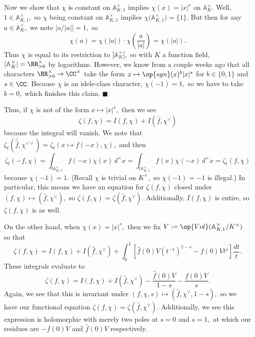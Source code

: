 Now we show that $\chi$ is constant on $\mathbb A^\times_{K,1}$ implies $\chi(x)=|x|^s$ on $\mathbb A^\times_K.$ Well, $1\in\mathbb A_{K,1}^\times,$ so $\chi$ being constant on $\mathbb A_{K,1}^\times$ implies $\chi\big(\mathbb A_{K,1}^\times\big)=\{1\}.$ But then for any $a\in\mathbb A^\times_K,$ we note $|a/|a||=1,$ so
\[\chi(a)=\chi(|a|)\cdot\chi\left(\frac a{|a|}\right)=\chi(|a|).\]
Thus $\chi$ is equal to its restriction to $|\mathbb A_K^\times|,$ so with $K$ a function field, $|\mathbb A_K^\times|=\RR^\times_{>0}$ by logarithms. However, we know from a couple weeks ago that all characters $\RR^\times_{>0}\to\CC^\times$ take the form $x\mapsto\op{sgn}(x)^b|x|^s$ for $b\in\{0,1\}$ and $s\in\CC.$ Because $\chi$ is an idele-class character, $\chi(-1)=1,$ so we have to take $b=0,$ which finishes this claim. $\blacksquare$

Thus, if $\chi$ is not of the form $x\mapsto|x|^s,$ then we see
\[\zeta(f,\chi)=I(f,\chi)+I(\hat f,\chi^\vee)\]
because the integral will vanish. We note that $\zeta_t(\hat\hat f,\chi^{\vee\vee})=\zeta_t(x\mapsto f(-x),\chi),$ and then
\[\zeta_t(-f,\chi)=\int_{t\mathbb A^\times_{K,1}}f(-x)\chi(x)\,d^\times x=\int_{t\mathbb A^\times_{K,1}}f(x)\chi(-x)\,d^\times x=\zeta_t(f,\chi)\]
because $\chi(-1)=1.$ (Recall $\chi$ is trivial on $K^\times,$ so $\chi(-1)=-1$ is illegal.) In particular, this means we have an equation for $\zeta(f,\chi)$ closed under $(f,\chi)\mapsto(\hat f,\chi^\vee),$ so $\zeta(f,\chi)=\zeta(\hat f,\chi^\vee).$ Additionally, $I(f,\chi)$ is entire, so $\zeta(f,\chi)$ is as well.

On the other hand, when $\chi(x)=|x|^s,$ then we fix $V:=\op{Vol}(\mathbb A^\times_{K,1}/K^\times)$ so that
\[\zeta(f,\chi)=I(f,\chi)+I(\hat f,\chi^\vee)+\int_0^1\left[\hat f(0)V(t^{-1})^{1-s}-f(0)Vt^s\right]\frac{dt}t.\]
These integrals evaluate to
\[\zeta(f,\chi)=I(f,\chi)+I(\hat f,\chi^\vee)-\frac{\hat f(0)V}{1-s}-\frac{f(0)V}s.\]
Again, we see that this is invariant under $(f,\chi,s)\mapsto(\hat f,\chi^\vee,1-s),$ so we have our functional equation $\zeta(f,\chi)=\zeta(\hat f,\chi^\vee).$ Additionally, we see this expression is holomorphic with merely two poles at $s=0$ and $s=1,$ at which our residues are $-f(0)V$ and $\hat f(0)V$ respectively.

